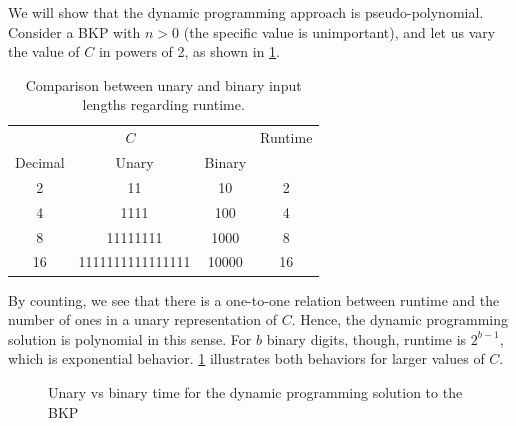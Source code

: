 \begin{example}

    We will show that the dynamic programming approach is pseudo-polynomial. Consider a BKP with $n > 0$ (the specific value is unimportant), and let us vary the value of $C$ in powers of 2, as shown in \cref{tab:kp runtimes table}.

    \begin{table}[h]
        \centering
        \caption{Comparison between unary and binary input lengths regarding runtime.}
        \label{tab:kp runtimes table}
        \begin{tabular}{cccc}
            \toprule
            \multicolumn{3}{c}{$C$} & Runtime\\
            \cmidrule(lr){1-3}
            Decimal & Unary & Binary &\\
            \midrule
            2 & 11 & 10 & 2\\
            4 & 1111 & 100 & 4\\
            8 & 11111111 & 1000 & 8\\
            16 & 1111111111111111 & 10000 & 16\\
            \bottomrule
        \end{tabular}
    \end{table}

    By counting, we see that there is a one-to-one relation between runtime and the number of ones in a unary representation of $C$. Hence, the dynamic programming solution is polynomial in this sense. For $b$ binary digits, though, runtime is $2^{b-1}$, which is exponential behavior. \cref{fig:unary vs binary time} illustrates both behaviors for larger values of $C$.

    \begin{figure}[h]
        \centering
        \caption{Unary vs binary time for the dynamic programming solution to the BKP}
        \label{fig:unary vs binary time}
    \end{figure}

\end{example}

